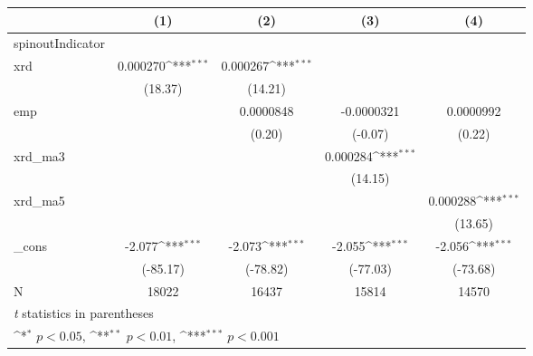 {
\def\sym#1{\ifmmode^{#1}\else\(^{#1}\)\fi}
\begin{tabular}{l*{4}{c}}
\hline\hline
            &\multicolumn{1}{c}{(1)}         &\multicolumn{1}{c}{(2)}         &\multicolumn{1}{c}{(3)}         &\multicolumn{1}{c}{(4)}         \\
\hline
spinoutIndicator&                     &                     &                     &                     \\
xrd         &    0.000270\sym{***}&    0.000267\sym{***}&                     &                     \\
            &     (18.37)         &     (14.21)         &                     &                     \\
[1em]
emp         &                     &   0.0000848         &  -0.0000321         &   0.0000992         \\
            &                     &      (0.20)         &     (-0.07)         &      (0.22)         \\
[1em]
xrd\_ma3     &                     &                     &    0.000284\sym{***}&                     \\
            &                     &                     &     (14.15)         &                     \\
[1em]
xrd\_ma5     &                     &                     &                     &    0.000288\sym{***}\\
            &                     &                     &                     &     (13.65)         \\
[1em]
\_cons      &      -2.077\sym{***}&      -2.073\sym{***}&      -2.055\sym{***}&      -2.056\sym{***}\\
            &    (-85.17)         &    (-78.82)         &    (-77.03)         &    (-73.68)         \\
\hline
N           &       18022         &       16437         &       15814         &       14570         \\
\hline\hline
\multicolumn{5}{l}{\footnotesize \textit{t} statistics in parentheses}\\
\multicolumn{5}{l}{\footnotesize \sym{*} \(p<0.05\), \sym{**} \(p<0.01\), \sym{***} \(p<0.001\)}\\
\end{tabular}
}

